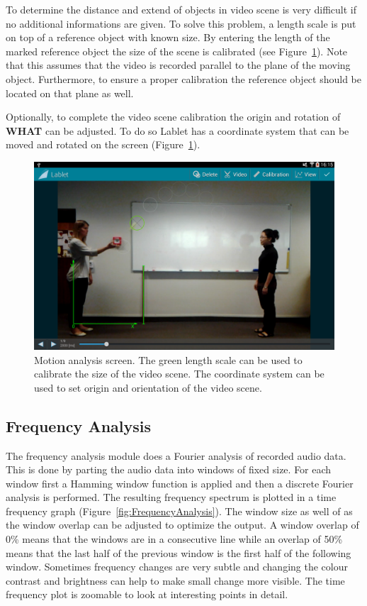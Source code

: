\documentclass{sigchi}
\begin{document}
To determine the distance and extend of objects in video scene is very
difficult if no additional informations are given.  To solve this
problem, a length scale is put on top of a reference object with known
size.  By entering the length of the marked reference object the size
of the scene is calibrated (see Figure~\ref{fig:MotionAnalysis}).
Note that this assumes that the video is recorded parallel to the
plane of the moving object.  Furthermore, to ensure a proper
calibration the reference object should be located on that plane as
well.

Optionally, to complete the video scene calibration the origin and
rotation of {\bf WHAT} can be adjusted.  To do so Lablet has a coordinate system
that can be moved and rotated on the screen
(Figure~\ref{fig:MotionAnalysis}).


\begin{figure}
  \centering
  \includegraphics[width=.99\columnwidth]{MotionAnalysis}
  \caption{Motion analysis screen.  The green length scale can be used
    to calibrate the size of the video scene.  The coordinate system
    can be used to set origin and orientation of the video
    scene.\label{fig:MotionAnalysis} }
\end{figure}

\subsection{Frequency Analysis}
The frequency analysis module does a Fourier analysis of recorded
audio data.  This is done by parting the audio data into windows of
fixed size.  For each window first a Hamming window function is
applied and then a discrete Fourier analysis is performed.  The
resulting frequency spectrum is plotted in a time frequency graph
(Figure~\ref{fig:FrequencyAnalysis}).  The window size as well of as
the window overlap can be adjusted to optimize the output.  A window
overlap of 0\% means that the windows are in a consecutive line while
an overlap of 50\% means that the last half of the previous window is
the first half of the following window.  Sometimes frequency changes
are very subtle and changing the colour contrast and brightness can
help to make small change more visible.  The time frequency plot is
zoomable to look at interesting points in detail.
\end{document}
